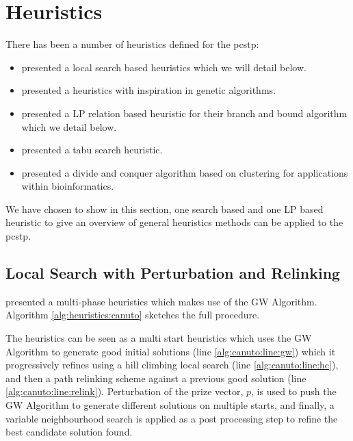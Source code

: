 \section{Heuristics}\label{sec:solving:heuristics}
There has been a number of heuristics defined for the \gls{pcstp}:

\begin{itemize}
\item \citet{canuto2001local} presented a local search based heuristics which we
   will detail below.
 \item \citet{Ljubic:2004:memetic} presented a heuristics with inspiration in genetic
   algorithms.
 \item \citet{ljubic2005solving} presented a LP relation based heuristic for their branch
   and bound algorithm which we detail below.
\item \citet{fu2014knowledge} presented a tabu search heuristic.
 \item \citet{akhmedov2016divide} presented a divide and conquer algorithm based on clustering
    for applications within bioinformatics.
\end{itemize}
We have chosen to show in this section, one search based and one LP based heuristic to give
an overview of general heuristics methods can be applied to the \gls{pcstp}.
\subsection{Local Search with Perturbation and Relinking}\label{sec:canuto-search}

\citet{canuto2001local} presented a multi-phase heuristics which makes use of the GW Algorithm.
 Algorithm \ref{alg:heuristics:canuto} sketches the full procedure. 

 The heuristics can be seen as a multi start heuristics which uses the GW Algorithm
 to generate good initial
 solutions (line \ref{alg:canuto:line:gw})
 which it progressively refines using a hill climbing local search
 (line \ref{alg:canuto:line:hc}),
 and then a path relinking scheme against a previous good solution
 (line \ref{alg:canuto:line:relink}).
 Perturbation of the prize vector, $p$, is used to push the GW Algorithm to generate
 different solutions on multiple starts, and finally, a
 variable neighbourhood search is applied as a
 post processing step to refine the best candidate solution found.

